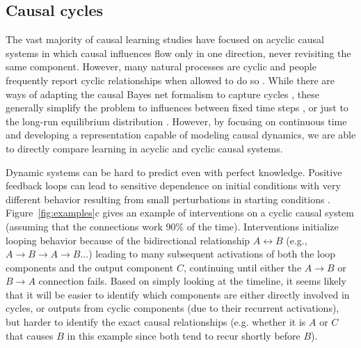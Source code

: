 \documentclass[10pt,letterpaper]{article}
\begin{document}
\subsection{Causal cycles}

The vast majority of causal learning studies have focused on acyclic causal systems in which causal influences flow only in one direction, never revisiting the same component.  However, many natural processes are cyclic and people frequently report cyclic relationships when allowed to do so \citep[e.g.][]{sloman1998feature}.  While there are ways of adapting the causal Bayes net formalism to capture cycles \citep{rehder2016cycles}, these generally simplify the problem to influences between fixed time steps \citep[e.g.][]{rottman2012causal}, or just to the long-run equilibrium distribution \citep[e.g.][]{lauritzen2002chain}.  However, by focusing on continuous time and developing a representation capable of modeling causal dynamics, we are able to directly compare learning in acyclic and cyclic causal systems.%

Dynamic systems can be hard to predict even with perfect knowledge.  Positive feedback loops can lead to sensitive dependence on initial conditions with very different behavior resulting from small perturbations in starting conditions \citep[e.g.,][]{gleick1997chaos}.  
Figure~\ref{fig:examples}c gives an example of interventions on a cyclic causal system (assuming that the connections work 90\% of the time).  Interventions initialize looping behavior because of the bidirectional relationship $A \leftrightarrow B$ (e.g., $A\rightarrow B \rightarrow A \rightarrow B\ldots$) leading to many subsequent activations of both the loop components and the output component $C$, continuing until either the $A\rightarrow B$ or $B\rightarrow A$ connection fails. Based on simply looking at the timeline, it seems likely that it will be easier to identify which components are either directly involved in cycles, or outputs from cyclic components (due to their recurrent activations), but harder to identify the exact causal relationships (e.g. whether it is $A$ or $C$ that causes $B$ in this example since both tend to recur shortly before $B$).
\end{document}
